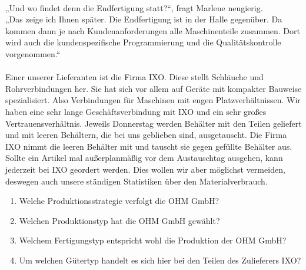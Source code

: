 {\\
„Und wo findet denn die Endfertigung statt?“, fragt Marlene neugierig.
\\
„Das zeige ich Ihnen später. Die Endfertigung ist in der Halle gegenüber. Da kommen dann je nach Kundenanforderungen alle Maschinenteile zusammen. Dort wird auch die kundenspezifische Programmierung und die Qualitätskontrolle vorgenommen.“
\\~\\
Einer unserer Lieferanten ist die Firma IXO. Diese stellt Schläuche und Rohrverbindungen her. Sie hat sich vor allem auf Geräte mit kompakter Bauweise spezialisiert. Also Verbindungen für Maschinen mit engen Platzverhältnissen. Wir haben eine sehr lange Geschäftsverbindung mit IXO und ein sehr großes Vertrauensverhältnis. Jeweils Donnerstag werden Behälter mit den Teilen geliefert und mit leeren Behältern, die bei uns geblieben sind, ausgetauscht. Die Firma IXO nimmt die leeren Behälter mit und tauscht sie gegen gefüllte Behälter aus. Sollte ein Artikel mal außerplanmäßig vor dem Austauschtag ausgehen, kann jederzeit bei IXO geordert werden. Dies wollen wir aber möglichst vermeiden, deswegen auch unsere ständigen Statistiken über den Materialverbrauch.

\begin{enumerate}[label=\alph*)]
    \item Welche Produktionsstrategie verfolgt die OHM GmbH?
    \item Welchen Produktionstyp hat die OHM GmbH gewählt?
    \item Welchem Fertigungstyp entspricht wohl die Produktion der OHM GmbH?
    \item Um welchen Gütertyp handelt es sich hier bei den Teilen des Zulieferers IXO?
\end{enumerate}
}

